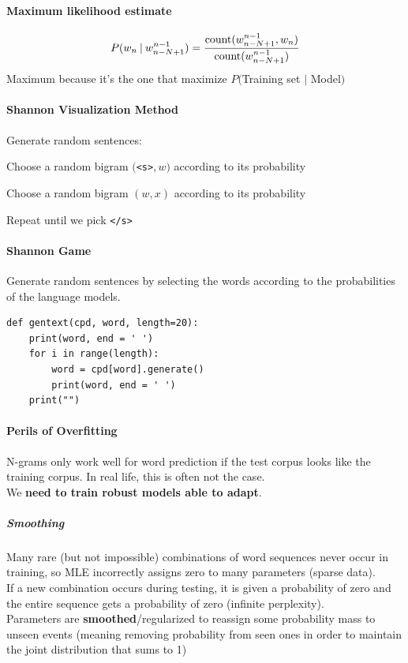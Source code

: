 \documentclass[10pt]{report}
\begin{document}
\paragraph{Maximum likelihood estimate}$$P(w_n\:|\:w_{n-N+1}^{n-1}) = \frac{\hbox{count}(w_{n-N+1}^{n-1},w_n)}{\hbox{count}(w_{n-N+1}^{n-1})}$$
Maximum because it's the one that maximize $P($Training set $|$ Model$)$
\paragraph{Shannon Visualization Method} Generate random sentences:
\begin{list}{}{}
	\item Choose a random bigram $($\texttt{<s>}$,w)$ according to its probability
	\item Choose a random bigram $(w,x)$ according to its probability
	\item Repeat until we pick \texttt{</s>}
\end{list}
\paragraph{Shannon Game} Generate random sentences by selecting the words according to the probabilities of the language models.
\begin{lstlisting}[style=myPython]
def gentext(cpd, word, length=20):
	print(word, end = ' ')
	for i in range(length):
		word = cpd[word].generate()
		print(word, end = ' ')
	print("")
\end{lstlisting}
\paragraph{Perils of Overfitting} N-grams only work well for word prediction if the test corpus looks like the training corpus. In real life, this is often not the case.\\
We \textbf{need to train robust models able to adapt}.
\subparagraph{Smoothing} Many rare (but not impossible) combinations of word sequences never occur in training, so MLE incorrectly assigns zero to many parameters (sparse data).\\
If a new combination occurs during testing, it is given a probability of zero and the entire sequence gets a probability of zero (infinite perplexity).\\
Parameters are \textbf{smoothed}/regularized to reassign some probability mass to unseen events (meaning removing probability from seen ones in order to maintain the joint distribution that sums to 1)
\end{document}
